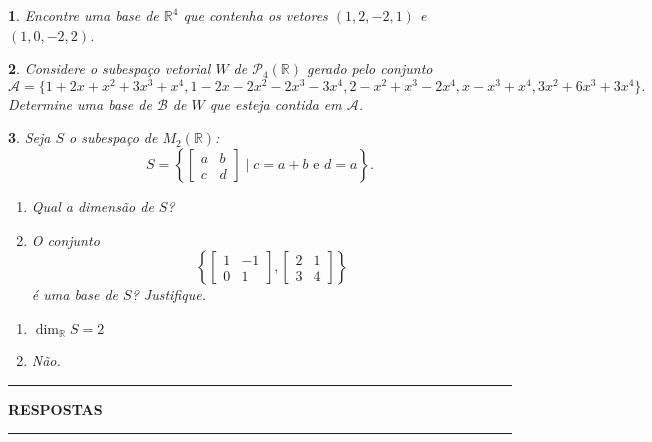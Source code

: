 \documentclass[12pt]{exam}
\newtheorem{exercicio}{}
\newcommand{\real}{\mathbb{R}}
\begin{document}
\begin{exercicio}
  Encontre uma base de $\real^4$ que contenha os vetores $(1,2,-2,1)$ e $(1,0,-2,2)$.
\end{exercicio}

\begin{exercicio}
  Considere o subespa\c{c}o vetorial $W$ de $\mathcal{P}_4(\real)$ gerado pelo conjunto
  \[
    \mathcal{A} = \{1+2x+x^2+3x^3+x^4, 1-2x-2x^2-2x^3-3x^4,2-x^2+x^3-2x^4,x-x^3+x^4,3x^2+6x^3+3x^4\}.
  \]
  Determine uma base de $\mathcal{B}$ de $W$ que esteja contida em $\mathcal{A}$.
\end{exercicio}

\begin{exercicio}
  Seja $S$ o subespa\c{c}o de $M_2(\real)$:
  \[
    S = \left\{\begin{bmatrix}
      a & b\\c & d
    \end{bmatrix} \mid c = a+b \mbox{ e } d = a\right\}.
  \]
  \begin{enumerate}[label={\alph*})]
    \item Qual a dimens\~ao de $S$?
    \item O conjunto
    \[
      \left\{\begin{bmatrix}
        1 & -1\\0 & 1
      \end{bmatrix}, \begin{bmatrix}
        2 & 1\\3 & 4
      \end{bmatrix}\right\}
    \]
    \'e uma base de $S$? Justifique.
  \end{enumerate}
  \begin{solucao}
    \begin{enumerate}[label={\alph*})]
      \item $\dim_\real S = 2$
      \item N\~ao.
    \end{enumerate}
  \end{solucao}
\end{exercicio}

\newpage
{}
\hrule
\begin{center}
{\large\bf RESPOSTAS}
\end{center}
\hrule

\end{document}
